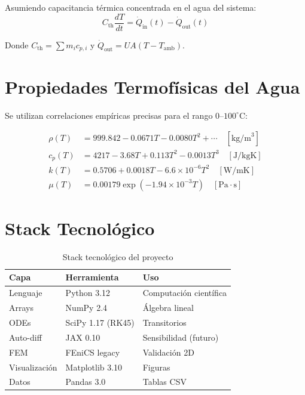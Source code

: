\documentclass[11pt,a4paper]{report}
\begin{document}
Asumiendo capacitancia térmica concentrada en el agua del sistema:
\begin{equation}
C_{\text{th}} \frac{dT}{dt} = \dot{Q}_{\text{in}}(t) - \dot{Q}_{\text{out}}(t)
\end{equation}

Donde $C_{\text{th}} = \sum m_i c_{p,i}$ y $\dot{Q}_{\text{out}} = UA(T - T_{\text{amb}})$.

\section{Propiedades Termofísicas del Agua}

Se utilizan correlaciones empíricas precisas para el rango 0--$100^\circ\text{C}$:

\begin{align}
\rho(T) &= 999.842 - 0.0671T - 0.0080T^2 + \cdots \quad [\text{kg/m}^3] \\
c_p(T) &= 4217 - 3.68T + 0.113T^2 - 0.0013T^3 \quad [\text{J/kgK}] \\
k(T) &= 0.5706 + 0.0018T - 6.6\times10^{-6}T^2 \quad [\text{W/mK}] \\
\mu(T) &= 0.00179 \exp(-1.94\times10^{-3}T) \quad [\text{Pa}\cdot\text{s}]
\end{align}

\section{Stack Tecnológico}

\begin{table}[H]
\centering
\caption{Stack tecnológico del proyecto}
\begin{tabular}{@{}lll@{}}
\toprule
\textbf{Capa} & \textbf{Herramienta} & \textbf{Uso} \\
\midrule
Lenguaje & Python 3.12 & Computación científica \\
Arrays & NumPy 2.4 & Álgebra lineal \\
ODEs & SciPy 1.17 (RK45) & Transitorios \\
Auto-diff & JAX 0.10 & Sensibilidad (futuro) \\
FEM & FEniCS legacy & Validación 2D \\
Visualización & Matplotlib 3.10 & Figuras \\
Datos & Pandas 3.0 & Tablas CSV \\
\bottomrule
\end{tabular}
\end{table}
\end{document}
